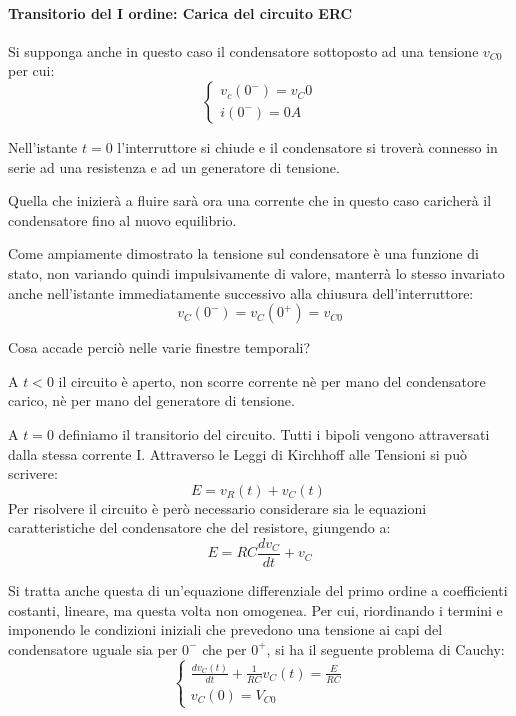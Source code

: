 \documentclass[a4paper, 12pt, twoside]{report}
\begin{document}
{\paragraph {Transitorio del I ordine: Carica del circuito ERC}	\mbox{} \newline

Si supponga anche in questo caso il condensatore sottoposto ad una tensione $v_{C0}$ per cui:
\[
	\begin{cases}
		v_c (0^-)=v_C0 \\
		i(0^- )=0A
	\end{cases}
\]

Nell’istante $t=0$ l’interruttore si chiude e il condensatore si troverà connesso in serie ad una resistenza e ad un generatore di tensione.

Quella che inizierà a fluire sarà ora una corrente che in questo caso caricherà il condensatore fino al nuovo equilibrio.

Come ampiamente dimostrato la tensione sul condensatore è una funzione di stato, non variando quindi impulsivamente di valore, manterrà lo stesso invariato anche nell’istante immediatamente successivo alla chiusura dell’interruttore:
\[
v_C\left(0^-\right)=v_C\left(0^+\right)=v_{C0}
\]

Cosa accade perciò nelle varie finestre temporali? 

A $t<0$ il circuito è aperto, non scorre corrente nè per mano del condensatore carico, nè per mano del generatore di tensione.

A $t=0$ definiamo il transitorio del circuito.
Tutti i bipoli vengono attraversati dalla stessa corrente I. Attraverso le Leggi di Kirchhoff alle Tensioni si può scrivere:
\[
E=v_R\left(t\right)+v_C\left(t\right)\ 
\]
Per risolvere il circuito è però necessario considerare sia le equazioni caratteristiche del condensatore che del resistore, giungendo a:
\begin{equation} 
E=RC\frac{dv_C}{dt}+v_C
\end{equation}

Si tratta anche questa di un’equazione differenziale del primo ordine a coefficienti costanti, lineare, ma questa volta non omogenea.
Per cui, riordinando i termini e imponendo le condizioni iniziali che prevedono una tensione ai capi del condensatore uguale sia per $0^-$ che per $0^+$, si ha il seguente problema di Cauchy:
\begin{equation}
	\begin{cases}
		\frac{dv_C\left(t\right)}{dt}+\frac{1}{RC}v_C\left(t\right)=\frac{E}{RC} \\
		 v_C\left(0\right)=V_{C0}
	\end{cases}
\end{equation}

}
\end{document}
